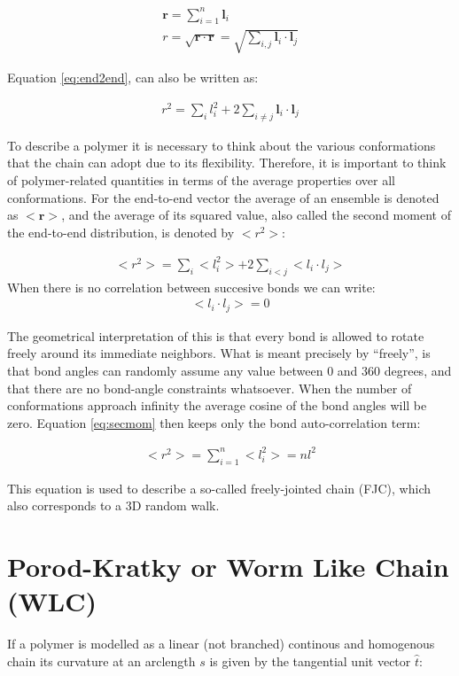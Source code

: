 \begin{gather}
\label{eq:e2e}
\mathbf{r} = \sum_{i=1}^{n} \mathbf{l}_{i}\\
\label{eq:end2end}
r = \sqrt{\mathbf{r} \cdot \mathbf{r}}
  = \sqrt{\sum_{i,j}\mathbf{l}_{i} \cdot \mathbf{l}_{j}}
\end{gather}

Equation \ref{eq:end2end}, can also be written as:

\begin{gather}
r^2 = \sum_{i}l_{i}^{2} + 2 \sum_{i\neq j} \mathbf{l}_{i} \cdot \mathbf{l}_{j}
\end{gather}  

To  describe a  polymer it  is necessary  to think  about  the various
conformations    that   the    chain    can   adopt    due   to    its
flexibility. Therefore,  it is  important to think  of polymer-related
quantities   in   terms   of   the   average   properties   over   all
conformations. For the end-to-end vector the average of an ensemble is
denoted as $<\mathbf{r}>$, and the  average of its squared value, also
called the second moment of the end-to-end distribution, is denoted by
$<r^2>$:

\begin{gather}
\label{eq:secmom}  
<r^2>=\sum_{i}<l_{i}^2> + 2\sum_{i<j}<l_{i} \cdot l_{j}>
\end{gather}  
When there is no correlation between succesive bonds we can write:
\begin{gather}
\label{eq:nocorr}
<l_{i} \cdot l_{j}> = 0
\end{gather}

The geometrical interpretation  of this is that every  bond is allowed
to  rotate  freely around  its  immediate  neighbors.   What is  meant
precisely by ``freely'',  is that bond angles can  randomly assume any
value  between 0 and  360 degrees,  and that  there are  no bond-angle
constraints  whatsoever.  When  the number  of  conformations approach
infinity the average cosine of the bond angles will be zero.  Equation
\ref{eq:secmom} then keeps only the bond auto-correlation term:

\begin{gather}
<r^2> = \sum_{i=1}^{n}<l_{i}^2> = nl^2
\end{gather}  

This equation is used to describe a so-called freely-jointed chain
(FJC), which also corresponds to a 3D random walk.

\section{Porod-Kratky or Worm Like Chain (WLC)}
If a polymer is modelled as a linear (not branched) continous and
homogenous chain its curvature at an arclength $s$ is given by the
tangential unit vector $\hat{t}$:

